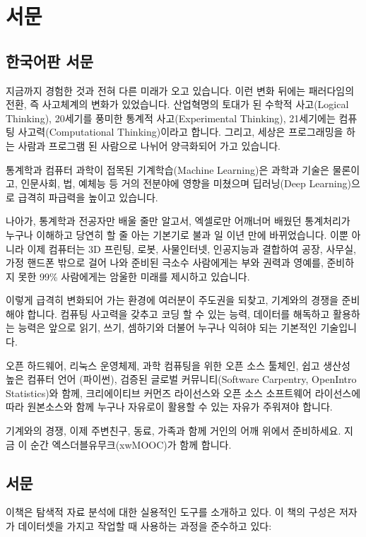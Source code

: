 \chapter{서문}
\label{preface}

\section{한국어판 서문}

지금까지 경험한 것과 전혀 다른 미래가 오고 있습니다. 이런 변화 뒤에는 패러다임의 전환, 
즉 사고체계의 변화가 있었습니다. 산업혁명의 토대가 된 수학적 사고(Logical Thinking), 20세기를 풍미한 통계적 사고(Experimental Thinking), 21세기에는 컴퓨팅 사고력(Computational Thinking)이라고 합니다. 그리고, 세상은 프로그래밍을 하는 사람과 프로그램 된 사람으로 나뉘어 양극화되어 가고 있습니다. 

통계학과 컴퓨터 과학이 접목된 기계학습(Machine Learning)은 과학과 기술은 물론이고, 
인문사회, 법, 예체능 등 거의 전분야에 영향을 미쳤으며 딥러닝(Deep Learning)으로 급격히 파급력을 높이고 있습니다.

나아가, 통계학과 전공자만 배울 줄만 알고서, 엑셀로만 어깨너머 배웠던 통계처리가 
누구나 이해하고 당연히 할 줄 아는 기본기로 불과 일 이년 만에 바뀌었습니다. 이뿐 아니라 이제 컴퓨터는 3D 프린팅, 로봇, 사물인터넷, 인공지능과 결합하여 공장, 사무실, 가정
핸드폰 밖으로 걸어 나와 준비된 극소수 사람에게는 부와 권력과 영예를, 준비하지 못한 99\% 사람에게는 암울한 미래를 제시하고 있습니다.

이렇게 급격히 변화되어 가는 환경에 여러분이 주도권을 되찾고, 기계와의 경쟁을 준비해야 합니다. 컴퓨팅 사고력을 갖추고 코딩 할 수 있는 능력, 데이터를 해독하고 활용하는 능력은 
앞으로 읽기, 쓰기, 셈하기와 더불어 누구나 익혀야 되는 기본적인 기술입니다.

오픈 하드웨어, 리눅스 운영체제, 과학 컴퓨팅을 위한 오픈 소스 툴체인, 쉽고 생산성 높은 컴퓨터 언어 (파이썬), 검증된 글로벌 커뮤니티(Software Carpentry, OpenIntro Statistics)와 함께, 크리에이티브 커먼즈 라이선스와 오픈 소스 소프트웨어 라이선스에 따라 
원본소스와 함께 누구나 자유로이 활용할 수 있는 자유가 주워져야 합니다.

기계와의 경쟁, 이제 주변친구, 동료, 가족과 함께 거인의 어깨 위에서 준비하세요. 
지금 이 순간 엑스더블유무크(xwMOOC)가 함께 합니다.

\section{서문}

이책은 탐색적 자료 분석에 대한 실용적인 도구를 소개하고 있다. 이 책의 구성은 저자가 데이터셋을 가지고 작업할 때 사용하는 과정을 준수하고 있다:

